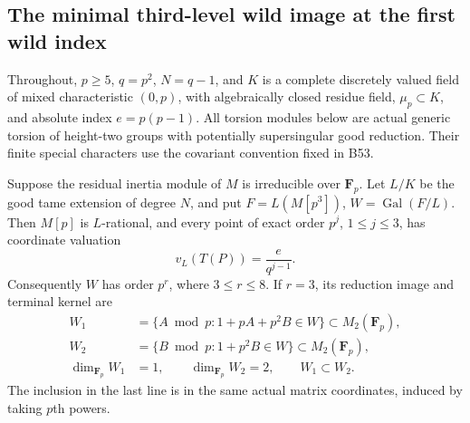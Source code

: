 \subsection{The minimal third-level wild image at the first wild index}

Throughout, \(p\ge5\), \(q=p^2\), \(N=q-1\), and \(K\) is a
complete discretely valued field of mixed characteristic \((0,p)\),
with algebraically closed residue field, \(\mu_p\subset K\), and
absolute index \(e=p(p-1)\). All torsion modules below are actual
generic torsion of height-two groups with potentially supersingular
good reduction. Their finite special characters use the covariant
convention fixed in B53.

\begin{lemma}
\label{lem:B-RD79-layers}
Suppose the residual inertia module of \(M\) is irreducible over
\(\mathbf F_p\). Let \(L/K\) be the good tame extension of degree
\(N\), and put \(F=L(M[p^3])\), \(W=\operatorname{Gal}(F/L)\).
Then \(M[p]\) is \(L\)-rational, and every point of exact order
\(p^j\), \(1\le j\le3\), has coordinate valuation
\[
             v_L(T(P))=\frac{e}{q^{j-1}}.
                                                     \tag{B-RD79.1}
\]
Consequently \(W\) has order \(p^r\), where \(3\le r\le8\).
If \(r=3\), its reduction image and terminal kernel are
\[
 \begin{split}
 W_1&=\{A\bmod p:1+pA+p^2B\in W\}\subset M_2(\mathbf F_p),\\
 W_2&=\{B\bmod p:1+p^2B\in W\}\subset M_2(\mathbf F_p),\\
 \dim_{\mathbf F_p}W_1&=1,\qquad
 \dim_{\mathbf F_p}W_2=2,\qquad W_1\subset W_2.
 \end{split}                                         \tag{B-RD79.2}
\]
The inclusion in the last line is in the same actual matrix
coordinates, induced by taking \(p\)th powers.
\end{lemma}
